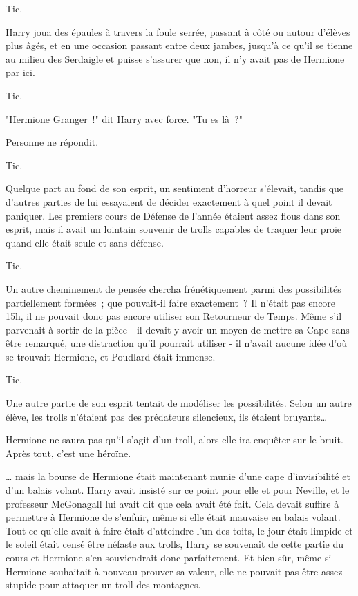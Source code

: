 Tic.

Harry joua des épaules à travers la foule serrée, passant à côté ou autour d'élèves plus âgés, et en une occasion passant entre deux jambes, jusqu'à ce qu'il se tienne au milieu des Serdaigle et puisse s'assurer que non, il n'y avait pas de Hermione par ici.

Tic.

"Hermione Granger~!" dit Harry avec force. "Tu es là~?"

Personne ne répondit.

Tic.

Quelque part au fond de son esprit, un sentiment d'horreur s'élevait, tandis que d'autres parties de lui essayaient de décider exactement à quel point il devait paniquer. Les premiers cours de Défense de l'année étaient assez flous dans son esprit, mais il avait un lointain souvenir de trolls capables de traquer leur proie quand elle était seule et sans défense.

Tic.

Un autre cheminement de pensée chercha frénétiquement parmi des possibilités partiellement formées~; que pouvait-il faire exactement~? Il n'était pas encore 15h, il ne pouvait donc pas encore utiliser son Retourneur de Temps. Même s'il parvenait à sortir de la pièce - il devait y avoir un moyen de mettre sa Cape sans être remarqué, une distraction qu'il pourrait utiliser - il n'avait aucune idée d'où se trouvait Hermione, et Poudlard était immense.

Tic.

Une autre partie de son esprit tentait de modéliser les possibilités. Selon un autre élève, les trolls n'étaient pas des prédateurs silencieux, ils étaient bruyants…

Hermione ne saura pas qu'il s'agit d'un troll, alors elle ira enquêter sur le bruit. Après tout, c'est une héroïne.

… mais la bourse de Hermione était maintenant munie d'une cape d'invisibilité et d'un balais volant. Harry avait insisté sur ce point pour elle et pour Neville, et le professeur McGonagall lui avait dit que cela avait été fait. Cela devait suffire à permettre à Hermione de s'enfuir, même si elle était mauvaise en balais volant. Tout ce qu'elle avait à faire était d'atteindre l'un des toits, le jour était limpide et le soleil était censé être néfaste aux trolls, Harry se souvenait de cette partie du cours et Hermione s'en souviendrait donc parfaitement. Et bien sûr, même si Hermione souhaitait à nouveau prouver sa valeur, elle ne pouvait pas être assez stupide pour attaquer un troll des montagnes.

